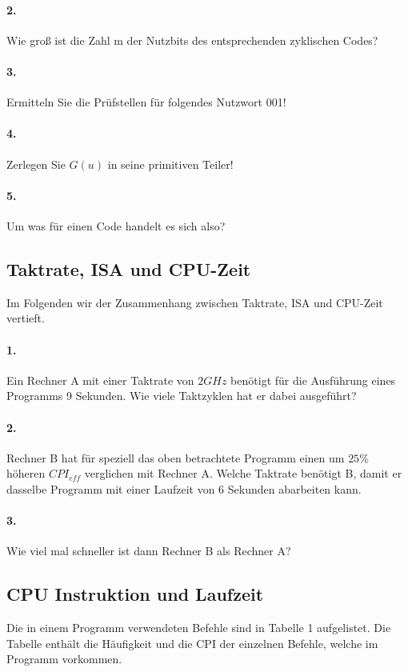 \documentclass[paper=a4, fontsize=11pt]{scrartcl}
\numberwithin{equation}{section}
\numberwithin{figure}{section}
\numberwithin{table}{section}
\begin{document}
\paragraph{2.}
Wie groß ist die Zahl m der Nutzbits des entsprechenden zyklischen Codes?

\paragraph{3.}
Ermitteln Sie die Prüfstellen für folgendes Nutzwort 001!

\paragraph{4.}
Zerlegen Sie $G(u)$ in seine primitiven Teiler!

\paragraph{5.}
Um was für einen Code handelt es sich also?

\subsection{Taktrate, ISA und CPU-Zeit}
Im Folgenden wir der Zusammenhang zwischen Taktrate, ISA und CPU-Zeit vertieft.

\paragraph{1.}
Ein Rechner A mit einer Taktrate von $2GHz$ benötigt für die Ausführung eines Programms 9 Sekunden. Wie viele Taktzyklen hat er dabei ausgeführt?

\paragraph{2.}
Rechner B hat für speziell das oben betrachtete Programm einen um $25 \%$ höheren $CPI_{eff}$ verglichen mit Rechner A. Welche Taktrate benötigt B, damit er dasselbe Programm mit einer Laufzeit von 6 Sekunden abarbeiten kann.

\paragraph{3.}
Wie viel mal schneller ist dann Rechner B als Rechner A?

\subsection{CPU Instruktion und Laufzeit}
Die in einem Programm verwendeten Befehle sind in Tabelle 1 aufgelistet. Die Tabelle enthält die Häufigkeit und die CPI der einzelnen Befehle, welche im Programm vorkommen.
\end{document}
